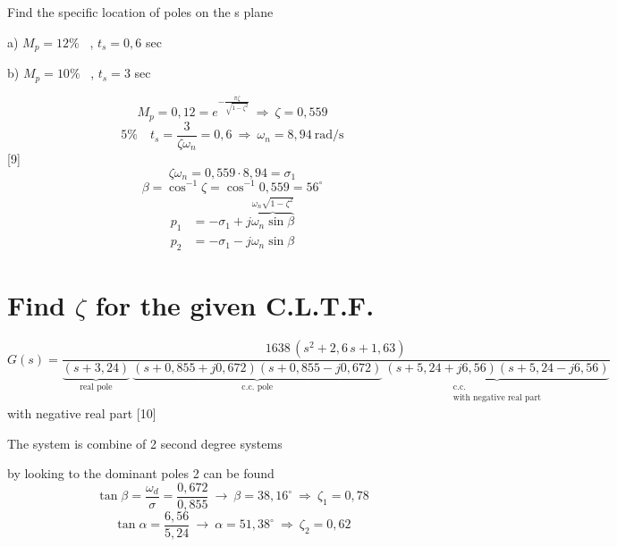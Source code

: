 \documentclass[11pt,a4paper]{article}
\begin{document}
\begin{ornek}
Find the specific location of poles on the s plane

a) $M_p=12\%$ \ , $t_s=0{,}6$ sec \quad {}

b) $M_p=10\%$ \ , $t_s=3$ sec
\end{ornek}
\[ M_p=0{,}12=e^{-\frac{\pi\zeta}{\sqrt{1-\zeta^2}}}\ \Rightarrow\ \zeta=0{,}559 \]
\[ 5\%\quad t_s=\frac{3}{\zeta\omega_n}=0{,}6\ \Rightarrow\ \omega_n=8{,}94\ \text{rad/s} \]
[9]
\[ \zeta\omega_n=0{,}559\cdot 8{,}94=\sigma_1 \]
\[ \beta=\cos^{-1}\zeta=\cos^{-1}0{,}559=56^\circ \]
\begin{align*}
p_1&=-\sigma_1+j\overbrace{\omega_n\sin\beta}^{\omega_n\sqrt{1-\zeta^2}}\\
p_2&=-\sigma_1-j\omega_n\sin\beta
\end{align*}

\section{Find $\zeta$ for the given C.L.T.F.}
{\small
\[ G(s)=\frac{1638\,(s^2+2{,}6\,s+1{,}63)}{\underbrace{(s+3{,}24)}_{\text{real pole}}\ \underbrace{(s+0{,}855+j0{,}672)(s+0{,}855-j0{,}672)}_{\text{c.c. pole}}\ \underbrace{(s+5{,}24+j6{,}56)(s+5{,}24-j6{,}56)}_{\substack{\text{c.c.}\\\text{with negative real part}}}} \]
}
with negative real part
[10]

The system is combine of 2 second degree systems

by looking to the dominant poles 2 can be found
\[ \tan\beta=\frac{\omega_d}{\sigma}=\frac{0{,}672}{0{,}855}\ \to\ \beta=38{,}16^\circ\ \Rightarrow\ \zeta_1=0{,}78 \]
\[ \tan\alpha=\frac{6{,}56}{5{,}24}\ \to\ \alpha=51{,}38^\circ\ \Rightarrow\ \zeta_2=0{,}62 \]
\end{document}
